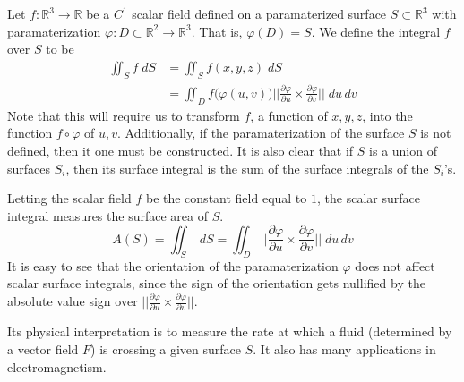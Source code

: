   \begin{definition}
  Let $f: \mathbb{R}^3 \longrightarrow \mathbb{R}$ be a $C^1$ scalar field defined on a paramaterized surface $S \subset \mathbb{R}^3$ with paramaterization $\varphi: D \subset \mathbb{R}^2 \longrightarrow \mathbb{R}^3$. That is, $\varphi(D) = S$. We define the integral $f$ over $S$ to be
  \begin{align*}
      \iint_S f \; dS & = \iint_S f(x, y, z) \; dS \\
      & = \iint_D f\big( \varphi(u, v)\big) \bigg|\bigg|\frac{\partial \varphi}{\partial u} \times \frac{\partial \varphi}{\partial v}\bigg|\bigg| \; du \,dv
  \end{align*}
  Note that this will require us to transform $f$, a function of $x, y, z$, into the function $f \circ \varphi$ of $u, v$. Additionally, if the paramaterization of the surface $S$ is not defined, then it one must be constructed. It is also clear that if $S$ is a union of surfaces $S_i$, then its surface integral is the sum of the surface integrals of the $S_i$'s. 
  \end{definition}

  Letting the scalar field $f$ be the constant field equal to $1$, the scalar surface integral measures the surface area of $S$. 
  \[A(S) = \iint_S \; dS = \iint_D \Big|\Big|\frac{\partial \varphi}{\partial u} \times \frac{\partial \varphi}{\partial v}\Big|\Big| \; du\, dv\]
  It is easy to see that the orientation of the paramaterization $\varphi$ does not affect scalar surface integrals, since the sign of the orientation gets nullified by the absolute value sign over $||\frac{\partial \varphi}{\partial u} \times \frac{\partial \varphi}{\partial v}||$. 

  Its physical interpretation is to measure the rate at which a fluid (determined by a vector field $F$) is crossing a given surface $S$. It also has many applications in electromagnetism. 

